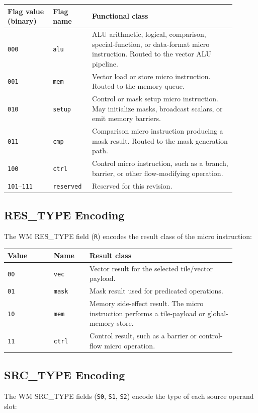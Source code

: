 \begin{longtable}{@{}L{0.18\linewidth}L{0.14\linewidth}L{0.58\linewidth}@{}}
\toprule
Flag value (binary) & Flag name & Functional class \\
\midrule
\texttt{000} & \texttt{alu} & ALU arithmetic, logical, comparison, special-function, or data-format micro instruction. Routed to the vector ALU pipeline. \\
\texttt{001} & \texttt{mem} & Vector load or store micro instruction. Routed to the memory queue. \\
\texttt{010} & \texttt{setup} & Control or mask setup micro instruction. May initialize masks, broadcast scalars, or emit memory barriers. \\
\texttt{011} & \texttt{cmp} & Comparison micro instruction producing a mask result. Routed to the mask generation path. \\
\texttt{100} & \texttt{ctrl} & Control micro instruction, such as a branch, barrier, or other flow-modifying operation. \\
\texttt{101}--\texttt{111} & \texttt{reserved} & Reserved for this revision. \\
\bottomrule
\end{longtable}

\subsection{RES\_TYPE Encoding}
\label{sec:res_type}
The WM RES\_TYPE field (\texttt{R}) encodes the result class of the micro instruction:

\begin{longtable}{@{}L{0.18\linewidth}L{0.14\linewidth}L{0.58\linewidth}@{}}
\toprule
Value & Name & Result class \\
\midrule
\texttt{00} & \texttt{vec} & Vector result for the selected tile/vector payload. \\
\texttt{01} & \texttt{mask} & Mask result used for predicated operations. \\
\texttt{10} & \texttt{mem} & Memory side-effect result. The micro instruction performs a tile-payload or global-memory store. \\
\texttt{11} & \texttt{ctrl} & Control result, such as a barrier or control-flow micro operation. \\
\bottomrule
\end{longtable}

\subsection{SRC\_TYPE Encoding}
\label{sec:src_type}
The WM SRC\_TYPE fields (\texttt{S0}, \texttt{S1}, \texttt{S2}) encode the type of each source operand slot:

